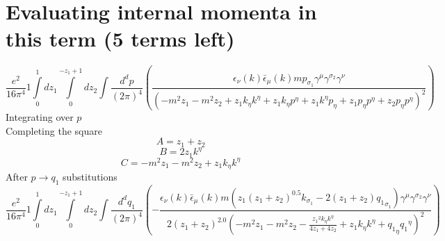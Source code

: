 \section*{Evaluating internal momenta in this term (5 terms left)}
\begin{dmath}\frac{e^{2}}{16 \pi^{4}}1\int\limits_{ 0 }^{ 1 } d{ z_{ 1 } }\int\limits_{ 0 }^{ - { z_{ 1 } } + 1 } d{ z_{ 2 } }\int\frac{d^d p }{ (2\pi)^4 }\left(\frac{\epsilon_{ \nu }({ k }) \bar{\epsilon}_{ \mu }({ k }) m { { p }_{ \sigma_1 } } { \gamma^{ \mu } } { \gamma^{ \sigma_2 } } { \gamma^{ \nu } }}{\left(- m^{2} { z_{ 1 } } - m^{2} { z_{ 2 } } + { z_{ 1 } } { { k }_{ \eta } } { { k }^{ \eta } } + { z_{ 1 } } { { k }_{ \eta } } { { p }^{ \eta } } + { z_{ 1 } } { { k }^{ \eta } } { { p }_{ \eta } } + { z_{ 1 } } { { p }_{ \eta } } { { p }^{ \eta } } + { z_{ 2 } } { { p }_{ \eta } } { { p }^{ \eta } }\right)^{2}}\right)\end{dmath}
Integrating over $p$\\
Completing the square\
\begin{dmath}A = { z_{ 1 } } + { z_{ 2 } }\end{dmath}
\begin{dmath}B = 2 { z_{ 1 } } { { k }^{ \eta } }\end{dmath}
\begin{dmath}C = - m^{2} { z_{ 1 } } - m^{2} { z_{ 2 } } + { z_{ 1 } } { { k }_{ \eta } } { { k }^{ \eta } }\end{dmath}
After $p \to q_1$ substitutions
\begin{dmath}\frac{e^{2}}{16 \pi^{4}}1\int\limits_{ 0 }^{ 1 } d{ z_{ 1 } }\int\limits_{ 0 }^{ - { z_{ 1 } } + 1 } d{ z_{ 2 } }\int\frac{d^d q_1 }{ (2\pi)^4 }\left(- \frac{\epsilon_{ \nu }({ k }) \bar{\epsilon}_{ \mu }({ k }) m \left({ z_{ 1 } } \left({ z_{ 1 } } + { z_{ 2 } }\right)^{0.5} { { k }_{ \sigma_1 } } - 2 \left({ z_{ 1 } } + { z_{ 2 } }\right) { { q_1 }_{ \sigma_1 } }\right) { \gamma^{ \mu } } { \gamma^{ \sigma_2 } } { \gamma^{ \nu } }}{2 \left({ z_{ 1 } } + { z_{ 2 } }\right)^{2.0} \left(- m^{2} { z_{ 1 } } - m^{2} { z_{ 2 } } - \frac{{ z_{ 1 } }^{2} { { k }_{ \eta } } { { k }^{ \eta } }}{4 { z_{ 1 } } + 4 { z_{ 2 } }} + { z_{ 1 } } { { k }_{ \eta } } { { k }^{ \eta } } + { { q_1 }_{ \eta } } { { q_1 }^{ \eta } }\right)^{2}}\right)\end{dmath}

